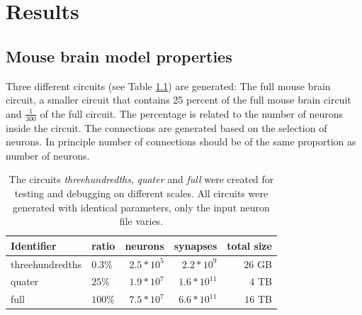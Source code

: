 %



\lstset{escapechar=@,style=customc}


\chapter{Results}

\section{Mouse brain model properties}

Three different circuits (see Table \ref{table:circuits}) are generated: The full mouse brain circuit,
a smaller circuit that contains 25 percent of the full mouse brain circuit and
$\frac{1}{300}$ of the full circuit. The percentage is related to the number of neurons inside
the circuit. The connections are generated based on the selection of neurons. In principle
number of connections should be of the same proportion as number of neurons.

\begin{table}[ht!]
\centering
    \begin{tabular}{ | l | l | r | r | r |}
    \hline
    Identifier & ratio & neurons & synapses & total size \\ \hline \hline
    threehundredths & $0.3\%$ & $~2.5*10^5$ & $~2.2*10^9$ & $~26$ GB \\ \hline
    quater & $25\%$ & $~1.9*10^7$ & $~1.6*10^{11}$ & $~4$ TB \\ \hline
    full & $100\%$ & $~7.5*10^7$ & $~6.6*10^{11}$ & $~16$ TB \\ \hline
    \end{tabular}
    \caption{The circuits \emph{threehundredths}, \emph{quater} and \emph{full} were created for testing and debugging on different scales.
All circuits were generated with identical parameters, only the input neuron file varies.}

\label{table:circuits}
\end{table}

